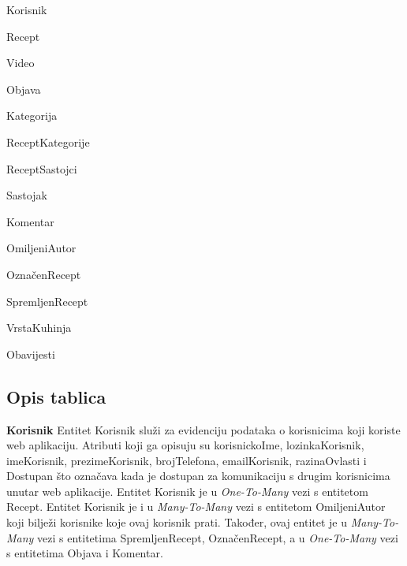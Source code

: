 \begin{packed_item}

	\item Korisnik
	\item Recept
	\item Video
	\item Objava
	\item Kategorija
	\item ReceptKategorije
	\item ReceptSastojci
	\item Sastojak
	\item Komentar
	\item OmiljeniAutor
	\item OznačenRecept
	\item SpremljenRecept
	\item VrstaKuhinja
	\item Obavijesti

\end{packed_item}

\eject

\subsection{Opis tablica}


\textnormal{\textbf{Korisnik}		Entitet Korisnik služi za evidenciju podataka o korisnicima koji koriste web aplikaciju. Atributi koji ga opisuju su korisnickoIme, lozinkaKorisnik, imeKorisnik, prezimeKorisnik, brojTelefona, emailKorisnik, razinaOvlasti i Dostupan što označava kada je dostupan za komunikaciju s drugim korisnicima unutar web aplikacije. Entitet Korisnik je u \textit{One-To-Many} vezi s entitetom Recept. Entitet Korisnik je i u \textit{Many-To-Many} vezi s entitetom OmiljeniAutor koji bilježi korisnike koje ovaj korisnik prati. Također, ovaj entitet je u \textit{Many-To-Many} vezi s entitetima SpremljenRecept, OznačenRecept, a u \textit{One-To-Many} vezi s entitetima Objava i Komentar.}


